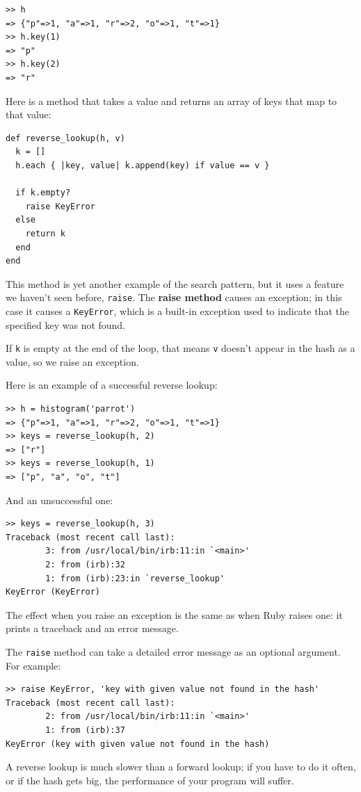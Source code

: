 \documentclass[10pt]{book}
\begin{document}
\begin{verbatim}
>> h
=> {"p"=>1, "a"=>1, "r"=>2, "o"=>1, "t"=>1}
>> h.key(1)
=> "p"
>> h.key(2)
=> "r"
\end{verbatim}

Here is a method that takes a value and returns an array of
keys that map to that value:

\begin{verbatim}
def reverse_lookup(h, v)
  k = []
  h.each { |key, value| k.append(key) if value == v }

  if k.empty?
    raise KeyError
  else
    return k
  end
end
\end{verbatim}
%
This method is yet another example of the search pattern, but it
uses a feature we haven't seen before, {\tt raise}.  The 
{\bf raise method} causes an exception; in this case it causes a
{\tt KeyError}, which is a built-in exception used to indicate
that the specified key was not found.
  
 

If {\tt k} is empty at the end of the loop, that means {\tt v}
doesn't appear in the hash as a value, so we raise an
exception.

Here is an example of a successful reverse lookup:

\begin{verbatim}
>> h = histogram('parrot')
=> {"p"=>1, "a"=>1, "r"=>2, "o"=>1, "t"=>1}
>> keys = reverse_lookup(h, 2)
=> ["r"]
>> keys = reverse_lookup(h, 1)
=> ["p", "a", "o", "t"]
\end{verbatim}
%
And an unsuccessful one:

\begin{verbatim}
>> keys = reverse_lookup(h, 3)
Traceback (most recent call last):
        3: from /usr/local/bin/irb:11:in `<main>'
        2: from (irb):32
        1: from (irb):23:in `reverse_lookup'
KeyError (KeyError)
\end{verbatim}
%
The effect when you raise an exception is the same as when
Ruby raises one: it prints a traceback and an error message.

The {\tt raise} method can take a detailed error message as an
optional argument.  For example:

\begin{verbatim}
>> raise KeyError, 'key with given value not found in the hash'
Traceback (most recent call last):
        2: from /usr/local/bin/irb:11:in `<main>'
        1: from (irb):37
KeyError (key with given value not found in the hash)
\end{verbatim}
%
A reverse lookup is much slower than a forward lookup; if you
have to do it often, or if the hash gets big, the performance
of your program will suffer.
\end{document}
